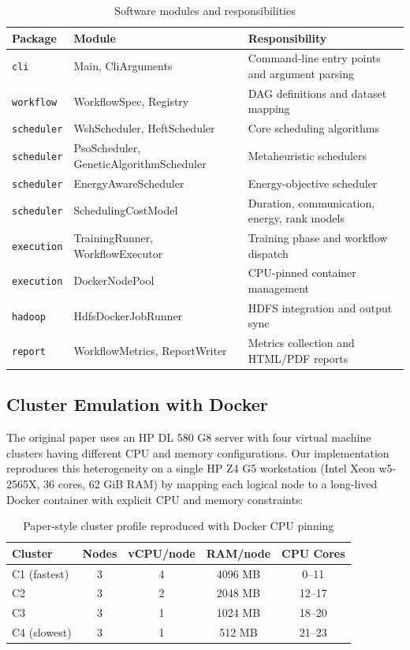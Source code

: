 \documentclass[12pt,a4paper]{article}
\begin{document}
\begin{table}[H]
\centering
\caption{Software modules and responsibilities}
\label{tab:modules}
\begin{tabular}{@{}lll@{}}
\toprule
\textbf{Package} & \textbf{Module} & \textbf{Responsibility} \\
\midrule
\texttt{cli} & Main, CliArguments & Command-line entry points and argument parsing \\
\texttt{workflow} & WorkflowSpec, Registry & DAG definitions and dataset mapping \\
\texttt{scheduler} & WshScheduler, HeftScheduler & Core scheduling algorithms \\
\texttt{scheduler} & PsoScheduler, GeneticAlgorithmScheduler & Metaheuristic schedulers \\
\texttt{scheduler} & EnergyAwareScheduler & Energy-objective scheduler \\
\texttt{scheduler} & SchedulingCostModel & Duration, communication, energy, rank models \\
\texttt{execution} & TrainingRunner, WorkflowExecutor & Training phase and workflow dispatch \\
\texttt{execution} & DockerNodePool & CPU-pinned container management \\
\texttt{hadoop} & HdfsDockerJobRunner & HDFS integration and output sync \\
\texttt{report} & WorkflowMetrics, ReportWriter & Metrics collection and HTML/PDF reports \\
\bottomrule
\end{tabular}
\end{table}

\subsection{Cluster Emulation with Docker}
The original paper uses an HP DL 580 G8 server with four virtual machine clusters having different CPU and memory configurations. Our implementation reproduces this heterogeneity on a single HP Z4 G5 workstation (Intel Xeon w5-2565X, 36 cores, 62 GiB RAM) by mapping each logical node to a long-lived Docker container with explicit CPU and memory constraints:

\begin{table}[H]
\centering
\caption{Paper-style cluster profile reproduced with Docker CPU pinning}
\label{tab:cluster}
\begin{tabular}{@{}lcccc@{}}
\toprule
\textbf{Cluster} & \textbf{Nodes} & \textbf{vCPU/node} & \textbf{RAM/node} & \textbf{CPU Cores} \\
\midrule
C1 (fastest) & 3 & 4 & 4096 MB & 0--11 \\
C2 & 3 & 2 & 2048 MB & 12--17 \\
C3 & 3 & 1 & 1024 MB & 18--20 \\
C4 (slowest) & 3 & 1 & 512 MB & 21--23 \\
\bottomrule
\end{tabular}
\end{table}
\end{document}
